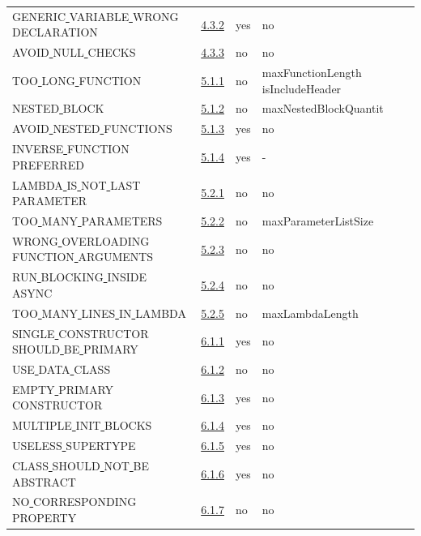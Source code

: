 \begin{longtable}{ |l|p{0.8cm}|p{0.8cm}| p{3cm} | }
GENERIC\underline{ }VARIABLE\underline{ }WRONG\underline{ }DECLARATION & \hyperref[sec:4.3.2]{4.3.2} &  yes  &   no  \\
AVOID\underline{ }NULL\underline{ }CHECKS & \hyperref[sec:4.3.3]{4.3.3} &  no  &   no  \\
TOO\underline{ }LONG\underline{ }FUNCTION & \hyperref[sec:5.1.1]{5.1.1} &  no  &   maxFunctionLength isIncludeHeader \\
NESTED\underline{ }BLOCK & \hyperref[sec:5.1.2]{5.1.2} &  no  &   maxNestedBlockQuantit\\
AVOID\underline{ }NESTED\underline{ }FUNCTIONS & \hyperref[sec:5.1.3]{5.1.3} &  yes  &   no  \\
INVERSE\underline{ }FUNCTION\underline{ }PREFERRED & \hyperref[sec:5.1.4]{5.1.4} &  yes  &  - \\
LAMBDA\underline{ }IS\underline{ }NOT\underline{ }LAST\underline{ }PARAMETER & \hyperref[sec:5.2.1]{5.2.1} &  no  &   no \\
TOO\underline{ }MANY\underline{ }PARAMETERS & \hyperref[sec:5.2.2]{5.2.2} &  no  &   maxParameterListSize \\
WRONG\underline{ }OVERLOADING\underline{ }FUNCTION\underline{ }ARGUMENTS & \hyperref[sec:5.2.3]{5.2.3} &  no  &   no \\
RUN\underline{ }BLOCKING\underline{ }INSIDE\underline{ }ASYNC & \hyperref[sec:5.2.4]{5.2.4} &  no  &   no \\
TOO\underline{ }MANY\underline{ }LINES\underline{ }IN\underline{ }LAMBDA & \hyperref[sec:5.2.5]{5.2.5} &  no  &   maxLambdaLength \\
SINGLE\underline{ }CONSTRUCTOR\underline{ }SHOULD\underline{ }BE\underline{ }PRIMARY & \hyperref[sec:6.1.1]{6.1.1} &  yes  &   no  \\
USE\underline{ }DATA\underline{ }CLASS & \hyperref[sec:6.1.2]{6.1.2} &  no  &   no  \\
EMPTY\underline{ }PRIMARY\underline{ }CONSTRUCTOR & \hyperref[sec:6.1.3]{6.1.3} &  yes  &   no  \\
MULTIPLE\underline{ }INIT\underline{ }BLOCKS & \hyperref[sec:6.1.4]{6.1.4} &  yes  &   no  \\
USELESS\underline{ }SUPERTYPE & \hyperref[sec:6.1.5]{6.1.5} &  yes  &   no  \\
CLASS\underline{ }SHOULD\underline{ }NOT\underline{ }BE\underline{ }ABSTRACT & \hyperref[sec:6.1.6]{6.1.6} &  yes  &   no  \\
NO\underline{ }CORRESPONDING\underline{ }PROPERTY & \hyperref[sec:6.1.7]{6.1.7} &  no  &   no  \\

\end{longtable}
